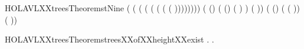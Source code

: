 \newcommand{\HOLAVLXXtreesTheoremstEight}{\UseVerbatim{HOLAVLXXtreesTheoremstEight}}
\begin{SaveVerbatim}{HOLAVLXXtreesTheoremstNine}
\HOLTokenTurnstile{}   
     (  
        (  
           (  
              (  
                 (  
                    (  
                       (   (   )))))))) \HOLSymConst{=}
      
     ( (\HOLSymConst{\ensuremath{-}})   ( (\HOLSymConst{\ensuremath{-}})   (     ) )
        (     ))
     ( (\HOLSymConst{\ensuremath{-}})   (     (     ))
        (     ))
\end{SaveVerbatim}
\newcommand{\HOLAVLXXtreesTheoremstNine}{\UseVerbatim{HOLAVLXXtreesTheoremstNine}}
\begin{SaveVerbatim}{HOLAVLXXtreesTheoremstreesXXofXXheightXXexist}
\HOLTokenTurnstile{} \HOLSymConst{\HOLTokenForall{}}. \HOLSymConst{\HOLTokenExists{}}.   \HOLSymConst{\HOLTokenConj{}}   \HOLSymConst{=} 
\end{SaveVerbatim}
\newcommand{\HOLAVLXXtreesTheoremstreesXXofXXheightXXexist}{\UseVerbatim{HOLAVLXXtreesTheoremstreesXXofXXheightXXexist}}
